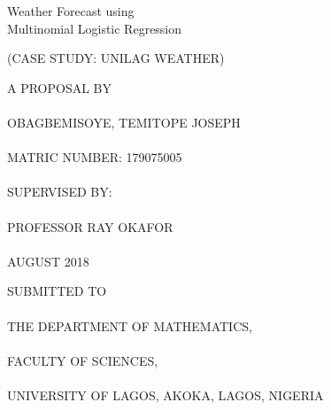 \documentclass[10pt,a4paper]{article}
\begin{document}
\begin{titlepage}
\begin{center}

\begin{Huge}
Weather Forecast using \\ Multinomial Logistic Regression \\[0.05in]
\end{Huge}

\begin{large}
(CASE STUDY: UNILAG WEATHER) \\[1.5in]
\end{large}


\begin{Large}
A PROPOSAL BY \\~\\
OBAGBEMISOYE, TEMITOPE JOSEPH \\~\\
MATRIC NUMBER: 179075005 \\~\\
SUPERVISED BY: \\~\\
PROFESSOR RAY OKAFOR \\~\\
AUGUST 2018 \\[1in]
\end{Large}

\begin{Large}
SUBMITTED TO \\~\\
THE DEPARTMENT OF MATHEMATICS, \\~\\
FACULTY OF SCIENCES, \\~\\
UNIVERSITY OF LAGOS, AKOKA, LAGOS, NIGERIA
\end{Large}

\end{center}
\end{titlepage}

\end{document}
